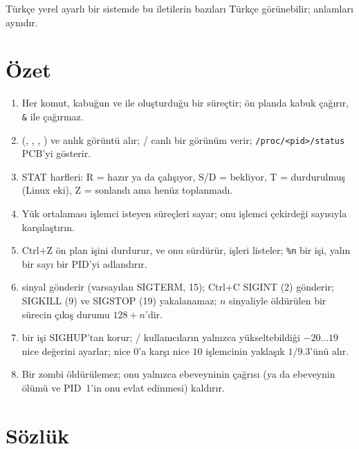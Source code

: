 Türkçe yerel ayarlı bir sistemde bu iletilerin bazıları Türkçe görünebilir; anlamları aynıdır.

\section{Özet}

\begin{keyidea}
\begin{enumerate}[leftmargin=1.4em]
  \item Her komut, kabuğun  ve  ile oluşturduğu bir süreçtir; ön planda kabuk  çağırır, \texttt{\&} ile çağırmaz.
  \item {} (, , , ) ve  anlık görüntü alır; / canlı bir görünüm verir; \texttt{/proc/<pid>/status} PCB'yi gösterir.
  \item STAT harfleri: R = hazır ya da çalışıyor, S/D = bekliyor, T = durdurulmuş (Linux eki), Z = sonlandı ama henüz toplanmadı.
  \item Yük ortalaması işlemci isteyen süreçleri sayar; onu işlemci çekirdeği sayısıyla karşılaştırın.
  \item Ctrl+Z ön plan işini durdurur,  ve  onu sürdürür,  işleri listeler; \texttt{\%n} bir işi, yalın bir sayı bir PID'yi adlandırır.
  \item {} sinyal gönderir (varsayılan SIGTERM, 15); Ctrl+C SIGINT (2) gönderir; SIGKILL (9) ve SIGSTOP (19) yakalanamaz; $n$ sinyaliyle öldürülen bir sürecin çıkış durumu $128 + n$'dir.
  \item {} bir işi SIGHUP'tan korur; / kullanıcıların yalnızca yükseltebildiği $-20 \dots 19$ nice değerini ayarlar; nice $0$'a karşı nice $10$ işlemcinin yaklaşık $1/9.3$'ünü alır.
  \item Bir zombi öldürülemez; onu yalnızca ebeveyninin  çağrısı (ya da ebeveynin ölümü ve PID~1'in onu evlat edinmesi) kaldırır.
\end{enumerate}
\end{keyidea}

\section{Sözlük}

